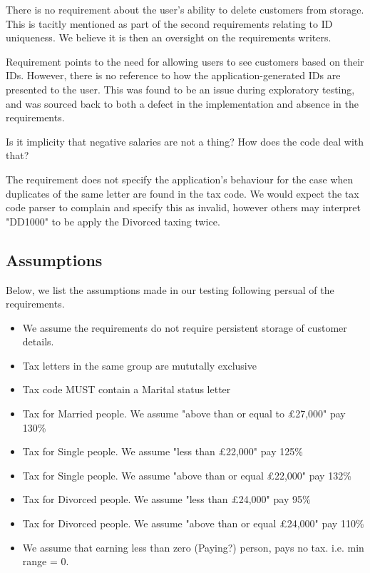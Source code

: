 There is no requirement about the user's ability to delete customers from storage. This is tacitly mentioned as part of the second requirements relating to ID uniqueness. We believe it is then an oversight on the requirements writers. 
\par
Requirement \RFour \space points to the need for allowing users to see customers based on their IDs. However, there is no reference to how the application-generated IDs are presented to the user. This was found to be an issue during exploratory testing, and was sourced back to both a defect in the implementation and absence in the requirements. 
\par
Is it implicity that negative salaries are not a thing? How does the code deal with that? 
\par
The requirement does not specify the application's behaviour for the case when duplicates of the same letter are found in the tax code. We would expect the tax code parser to complain and specify this as invalid, however others may interpret "DD1000" to be apply the Divorced taxing twice. 

\subsection{Assumptions}

Below, we list the assumptions made in our testing following persual of the requirements. 

\begin{itemize}
    \item We assume the requirements do not require persistent storage of customer details.
    \item Tax letters in the same group are mututally exclusive 
    \item Tax code MUST contain a Marital status letter
    \item Tax for Married people. We assume "above than or equal to £27,000" pay 130\%
    \item Tax for Single people. We assume "less than £22,000" pay 125\%
    \item Tax for Single people. We assume "above than or equal £22,000" pay 132\%
    \item Tax for Divorced people. We assume "less than £24,000" pay 95\%
    \item Tax for Divorced people. We assume "above than or equal £24,000" pay 110\%

	\item We assume that earning less than zero (Paying?) person, pays no tax. i.e. min range = 0. 
\end{itemize}

